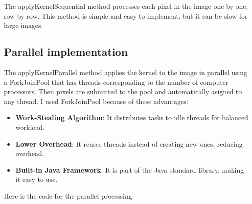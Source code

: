 \documentclass{article}
\begin{document}
\begin{multicols}{2}
    The applyKernelSequential method processes each pixel in the image one by one, row by row. This method is simple and easy to implement, but it can be slow for large images.

    \subsection{Parallel implementation}

    The applyKernelParallel method applies the kernel to the image in parallel using a ForkJoinPool that has threads corresponding to the number of computer processors. Then pixels are submitted to the pool and automatically asigned to any thread. I used ForkJoinPool because of these advantages:
    \cite{gallardo2014java}

    \begin{itemize}
        \item \textbf{Work-Stealing Algorithm}: It  distributes tasks to idle threads for balanced workload.
        \item \textbf{Lower Overhead}: It reuses threads instead of creating new ones, reducing overhead.
        \item \textbf{Built-in Java Framework}: It is part of the Java standard library, making it easy to use.
    \end{itemize}


    \newblock

    Here is the code for the parallel processing:


\end{multicols}
\end{document}

